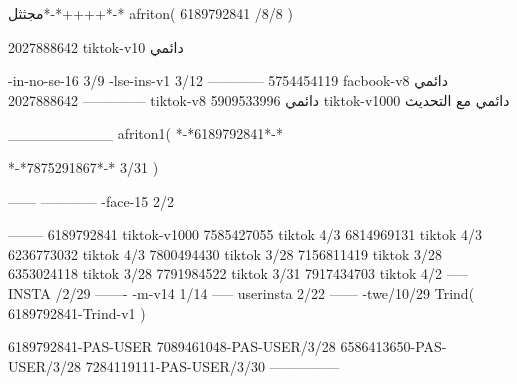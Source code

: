 مجثثل*-*++++*-*
afriton(
6189792841 /8/8
)

2027888642 tiktok-v10
دائمي

-in-no-se-16 3/9
-lse-ins-v1 3/12
------------
5754454119 facbook-v8
دائمي
--------------
2027888642 tiktok-v8
دائمي
5909533996 tiktok-v1000
دائمي مع التحديث

__________
afriton1(
*-*6189792841*-*

*-*7875291867*-* 3/31
)


------
------------
-face-15 2/2

--------
6189792841 tiktok-v1000
7585427055 tiktok 4/3
6814969131 tiktok 4/3
6236773032 tiktok 4/3
7800494430 tiktok 3/28
7156811419 tiktok 3/28
6353024118 tiktok 3/28
7791984522 tiktok 3/31
7917434703 tiktok 4/2
-----
 INSTA /2/29
-------
-m-v14 1/14
-----
userinsta 2/22
------
-twe/10/29
Trind(
6189792841-Trind-v1 
)

6189792841-PAS-USER
7089461048-PAS-USER/3/28
6586413650-PAS-USER/3/28
7284119111-PAS-USER/3/30
    ---------------
